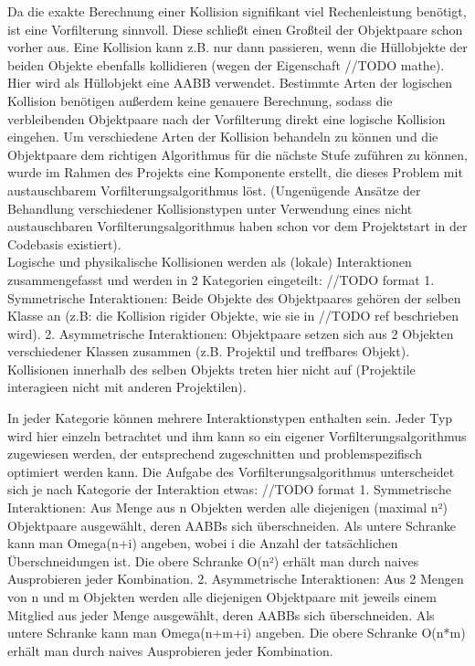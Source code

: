\label{sec: filter}
Da die exakte Berechnung einer Kollision signifikant viel Rechenleistung benötigt, ist eine Vorfilterung sinnvoll. Diese schließt einen Großteil der Objektpaare schon vorher aus. Eine Kollision kann z.B. nur dann passieren, wenn die Hüllobjekte der beiden Objekte ebenfalls kollidieren (wegen der Eigenschaft //TODO mathe). Hier wird als Hüllobjekt eine AABB verwendet. Bestimmte Arten der logischen Kollision benötigen außerdem keine genauere Berechnung, sodass die verbleibenden Objektpaare nach der Vorfilterung direkt eine logische Kollision eingehen. Um verschiedene Arten der Kollision behandeln zu können und die Objektpaare dem richtigen Algorithmus für die nächste Stufe zuführen zu können, wurde im Rahmen des Projekts eine Komponente erstellt, die dieses Problem mit austauschbarem Vorfilterungsalgorithmus löst. (Ungenügende Ansätze der Behandlung verschiedener Kollisionstypen unter Verwendung eines nicht austauschbaren Vorfilterungsalgorithmus haben schon vor dem Projektstart in der Codebasis existiert). \\
Logische und physikalische Kollisionen werden als (lokale) Interaktionen zusammengefasst und werden in 2 Kategorien eingeteilt:
//TODO format
1. Symmetrische Interaktionen: Beide Objekte des Objektpaares gehören der selben Klasse an (z.B: die Kollision rigider Objekte, wie sie in //TODO ref beschrieben wird).
2. Asymmetrische Interaktionen: Objektpaare setzen sich aus 2 Objekten verschiedener Klassen zusammen (z.B. Projektil und treffbares Objekt). Kollisionen innerhalb des selben Objekts treten hier nicht auf (Projektile interagieen nicht mit anderen Projektilen).

In jeder Kategorie können mehrere Interaktionstypen enthalten sein. Jeder Typ wird hier einzeln betrachtet und ihm kann so ein eigener Vorfilterungsalgorithmus zugewiesen werden, der entsprechend zugeschnitten und problemspezifisch optimiert werden kann.
Die Aufgabe des Vorfilterungsalgorithmus unterscheidet sich je nach Kategorie der Interaktion etwas:
//TODO format
1. Symmetrische Interaktionen: Aus Menge aus n Objekten werden alle diejenigen (maximal n²) Objektpaare ausgewählt, deren AABBs sich überschneiden. Als untere Schranke kann man Omega(n+i) angeben, wobei i die Anzahl der tatsächlichen Überschneidungen ist. Die obere Schranke O(n²) erhält man durch naives Ausprobieren jeder Kombination.
2. Asymmetrische Interaktionen: Aus 2 Mengen von n und m Objekten werden alle diejenigen Objektpaare mit jeweils einem Mitglied aus jeder Menge ausgewählt, deren AABBs sich überschneiden. Als untere Schranke kann man Omega(n+m+i) angeben. Die obere Schranke O(n*m) erhält man durch naives Ausprobieren jeder Kombination.

